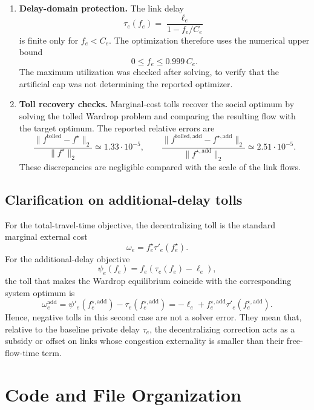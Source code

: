 \documentclass[11pt,a4paper]{article}
\begin{document}
\begin{enumerate}
    \item \textbf{Delay-domain protection.}
    The link delay
    \[
        \tau_e(f_e)=\frac{\ell_e}{1-f_e/C_e}
    \]
    is finite only for $f_e<C_e$. The optimization therefore uses the numerical upper bound
    \[
        0 \leq f_e \leq 0.999\,C_e.
    \]
    The maximum utilization was checked after solving, to verify that the artificial cap was
    not determining the reported optimizer.

    \item \textbf{Toll recovery checks.}
    Marginal-cost tolls recover the social optimum by solving the tolled Wardrop problem
    and comparing the resulting flow with the target optimum. The reported relative errors
    are
    \[
        \frac{\|f^{\mathrm{tolled}}-f^\star\|_2}{\|f^\star\|_2}
        \simeq 1.33\cdot 10^{-5},
        \qquad
        \frac{\|f^{\mathrm{tolled,add}}-f^{\star,\mathrm{add}}\|_2}
        {\|f^{\star,\mathrm{add}}\|_2}
        \simeq 2.51\cdot 10^{-5}.
    \]
    These discrepancies are negligible compared with the scale of the link flows.
\end{enumerate}

\subsection{Clarification on additional-delay tolls}

For the total-travel-time objective, the decentralizing toll is the standard marginal external
cost
\[
    \omega_e = f^\star_e \tau'_e(f^\star_e).
\]
For the additional-delay objective
\[
    \psi_e(f_e)=f_e(\tau_e(f_e)-\ell_e),
\]
the toll that makes the Wardrop equilibrium coincide with the corresponding system optimum is
\[
    \omega^{\mathrm{add}}_e
    =
    \psi'_e(f^{\star,\mathrm{add}}_e)
    -
    \tau_e(f^{\star,\mathrm{add}}_e)
    =
    -\ell_e
    +
    f^{\star,\mathrm{add}}_e \tau'_e(f^{\star,\mathrm{add}}_e).
\]
Hence, negative tolls in this second case are not a solver error. They mean that, relative to the
baseline private delay $\tau_e$, the decentralizing correction acts as a subsidy or offset on links
whose congestion externality is smaller than their free-flow-time term.

\section{Code and File Organization}
\end{document}
